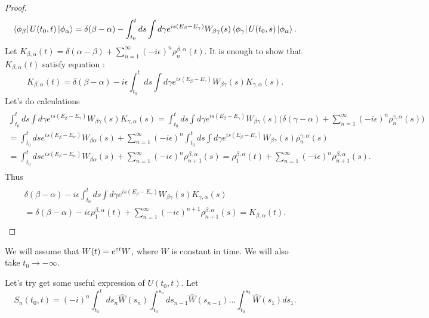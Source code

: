 \documentclass[main.tex]{subfiles}
\begin{document}
\begin{proof}
\begin{equation}
\bra{\phi_\beta} U(t_0, t) \ket{\phi_\alpha} = \delta(\beta - \alpha) - \int_{t_0}^t ds \int d\gamma e^{is(E_\beta - E_\gamma)} W_{\beta\gamma}(s) \bra{\phi_\gamma}U(t_0, s)\ket{\phi_\alpha}.
\end{equation}
Let $K_{\beta, \alpha}(t) = \delta(\alpha - \beta) + \sum_{n=1}^\infty (-i\epsilon)^n \rho^{\beta,\alpha}_n(t)$. It is enough to show that $K_{\beta, \alpha}(t)$ satisfy equation :
\begin{equation}
K_{\beta, \alpha}(t) = \delta(\beta - \alpha) - i\epsilon \int_{t_0}^t ds \int d\gamma e^{is(E_\beta - E_\gamma)} W_{\beta\gamma}(s) K_{\gamma, \alpha}(s).
\end{equation} 
Let's do calculations
\begin{multline*}
\\
\int_{t_0}^t ds \int d\gamma e^{is(E_\beta - E_\gamma)} W_{\beta\gamma}(s) K_{\gamma, \alpha}(s) = 
\int_{t_0}^t ds \int d\gamma e^{is(E_\beta - E_\gamma)} W_{\beta\gamma}(s) 
\bigg(\delta(\gamma - \alpha) + \sum_{n=1}^\infty (-i\epsilon)^n \rho^{\gamma,\alpha}_n(s)  \bigg) \\
= \int_{t_0}^t ds e^{is(E_\beta - E_\alpha)} W_{\beta\alpha}(s) + 
\sum_{n=1}^\infty (-i\epsilon)^n \int_{t_0}^t ds \int d\gamma e^{is(E_\beta - E_\gamma)} W_{\beta\gamma}(s) \rho^{\gamma,\alpha}_n(s)\\
=  \int_{t_0}^t ds e^{is(E_\beta - E_\alpha)} W_{\beta\alpha}(s) + \sum_{n=1}^\infty (-i\epsilon)^n \rho^{\beta,\alpha}_{n+1}(s) = \rho_1^{\beta,\alpha}(t) + \sum_{n=1}^\infty (-i\epsilon)^n \rho^{\beta,\alpha}_{n+1}(s).\\
\end{multline*}
Thus
\begin{multline*}\\
\delta(\beta - \alpha) - i\epsilon \int_{t_0}^t ds \int d\gamma e^{is(E_\beta - E_\gamma)} W_{\beta\gamma}(s) K_{\gamma, \alpha}(s) \\
= \delta(\beta - \alpha)-i\epsilon \rho_1^{\beta,\alpha}(t) + \sum_{n=1}^\infty (-i\epsilon)^{n + 1} \rho^{\beta,\alpha}_{n+1}(s) = K_{\beta, \alpha}(t).\\
\end{multline*}

\end{proof}

We will assume that $W(t) = e^{\eepsilon t} W$, where $W$ is constant in time. We will also take $t_0\to -\infty$. 

Let's try get some useful expression of $U(t_0, t)$.
Let
\begin{equation}
S_n(t_0, t) =  (-i)^n \int_{t_0}^t ds_n \hat{W}(s_n) \int_{t_0}^{s_n} ds_{n - 1} \hat{W}(s_{n-1})\dots \int_{t_0}^{s_2} \hat{W}(s_1)ds_1.
\end{equation}
\end{document}
